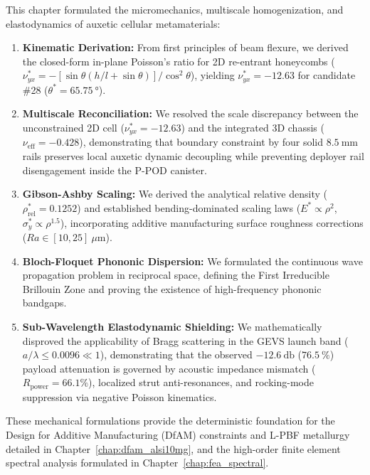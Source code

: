 This chapter formulated the micromechanics, multiscale homogenization, and elastodynamics of auxetic cellular metamaterials:
\begin{enumerate}
\item \textbf{Kinematic Derivation:} From first principles of beam flexure, we derived the closed-form in-plane Poisson's ratio for 2D re-entrant honeycombs ($\nu_{yx}^* = -[\sin\theta (h/l + \sin\theta)] / \cos^2\theta$), yielding $\nu_{yx}^* = -12.63$ for candidate \#28 ($\theta^* = \SI{65.75}{\degree}$).
\item \textbf{Multiscale Reconciliation:} We resolved the scale discrepancy between the unconstrained 2D cell ($\nu_{yx}^* = -12.63$) and the integrated 3D chassis ($\nu_{\text{eff}} = -0.428$), demonstrating that boundary constraint by four solid $\SI{8.5}{\milli\meter}$ rails preserves local auxetic dynamic decoupling while preventing deployer rail disengagement inside the P-POD canister.
\item \textbf{Gibson-Ashby Scaling:} We derived the analytical relative density ($\rho_{\text{rel}}^* = 0.1252$) and established bending-dominated scaling laws ($E^* \propto \rho^2$, $\sigma_y^* \propto \rho^{1.5}$), incorporating additive manufacturing surface roughness corrections ($Ra \in [10, 25]\ \mu\text{m}$).
\item \textbf{Bloch-Floquet Phononic Dispersion:} We formulated the continuous wave propagation problem in reciprocal space, defining the First Irreducible Brillouin Zone and proving the existence of high-frequency phononic bandgaps.
\item \textbf{Sub-Wavelength Elastodynamic Shielding:} We mathematically disproved the applicability of Bragg scattering in the GEVS launch band ($a/\lambda \le 0.0096 \ll 1$), demonstrating that the observed $\SI{-12.6}{\decibel}$ ($\SI{76.5}{\percent}$) payload attenuation is governed by acoustic impedance mismatch ($R_{\text{power}} = 66.1\%$), localized strut anti-resonances, and rocking-mode suppression via negative Poisson kinematics.
\end{enumerate}

These mechanical formulations provide the deterministic foundation for the Design for Additive Manufacturing (DfAM) constraints and L-PBF metallurgy detailed in Chapter~\ref{chap:dfam_alsi10mg}, and the high-order finite element spectral analysis formulated in Chapter~\ref{chap:fea_spectral}.
